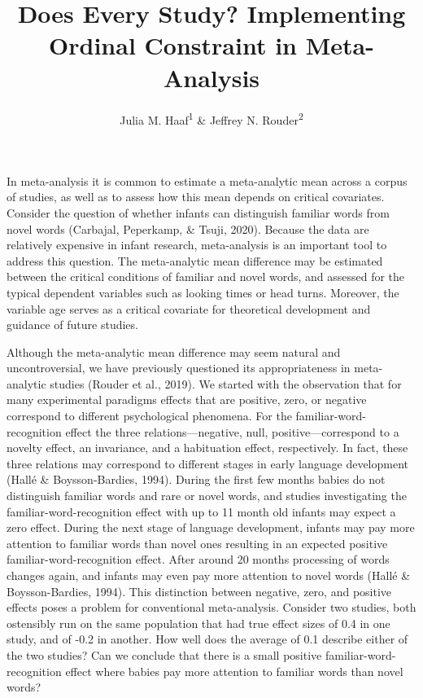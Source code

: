 \documentclass[english,,man]{apa6}
\title{Does Every Study? Implementing Ordinal Constraint in Meta-Analysis}
\author{Julia M. Haaf\textsuperscript{1} \& Jeffrey N. Rouder\textsuperscript{2}}
\date{}
\affiliation{\vspace{0.5cm}\textsuperscript{1} University of Amsterdam\\\textsuperscript{2} University of California-Irvine}
\begin{document}
\maketitle

In meta-analysis it is common to estimate a meta-analytic mean across a corpus of studies, as well as to assess how this mean depends on critical covariates. Consider the question of whether infants can distinguish familiar words from novel words (Carbajal, Peperkamp, \& Tsuji, 2020). Because the data are relatively expensive in infant research, meta-analysis is an important tool to address this question. The meta-analytic mean difference may be estimated between the critical conditions of familiar and novel words, and assessed for the typical dependent variables such as looking times or head turns. Moreover, the variable age serves as a critical covariate for theoretical development and guidance of future studies.

Although the meta-analytic mean difference may seem natural and uncontroversial, we have previously questioned its appropriateness in meta-analytic studies (Rouder et al., 2019). We started with the observation that for many experimental paradigms effects that are positive, zero, or negative correspond to different psychological phenomena. For the familiar-word-recognition effect the three relations---negative, null, positive---correspond to a novelty effect, an invariance, and a habituation effect, respectively. In fact, these three relations may correspond to different stages in early language development (Hallé \& Boysson-Bardies, 1994). During the first few months babies do not distinguish familiar words and rare or novel words, and studies investigating the familiar-word-recognition effect with up to 11 month old infants may expect a zero effect. During the next stage of language development, infants may pay more attention to familiar words than novel ones resulting in an expected positive familiar-word-recognition effect. After around 20 months processing of words changes again, and infants may even pay more attention to novel words (Hallé \& Boysson-Bardies, 1994). This distinction between negative, zero, and positive effects poses a problem for conventional meta-analysis. Consider two studies, both ostensibly run on the same population that had true effect sizes of 0.4 in one study, and of -0.2 in another. How well does the average of 0.1 describe either of the two studies? Can we conclude that there is a small positive familiar-word-recognition effect where babies pay more attention to familiar words than novel words?
\end{document}
